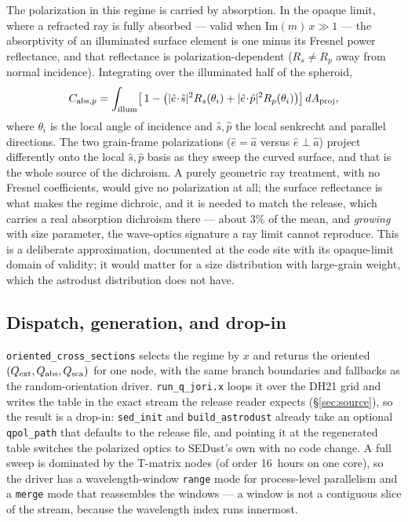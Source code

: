 \documentclass{my_memo}
\newcommand{\code}[1]{\texttt{#1}}
\begin{document}
The polarization in this regime is carried by absorption. In the opaque limit,
where a refracted ray is fully absorbed --- valid when
$\mathrm{Im}(m)\,x\gg1$ --- the absorptivity of an illuminated surface element is
one minus its Fresnel power reflectance, and that reflectance is
polarization-dependent ($R_s\neq R_p$ away from normal incidence). Integrating
over the illuminated half of the spheroid,
\[
  C_{{\rm abs},p}=\int_{\rm illum}
    \bigl[\,1-\bigl(|\hat e\!\cdot\!\hat s|^2 R_s(\theta_i)
                   +|\hat e\!\cdot\!\hat p|^2 R_p(\theta_i)\bigr)\bigr]
    \,dA_{\rm proj},
\]
where $\theta_i$ is the local angle of incidence and $\hat s,\hat p$ the local
senkrecht and parallel directions. The two grain-frame polarizations
($\hat e=\hat a$ versus $\hat e\perp\hat a$) project differently onto the local
$\hat s,\hat p$ basis as they sweep the curved surface, and that is the whole
source of the dichroism. A purely geometric ray treatment, with no Fresnel
coefficients, would give no polarization at all; the surface reflectance is what
makes the regime dichroic, and it is needed to match the release, which carries
a real absorption dichroism there --- about $3\%$ of the mean, and
\emph{growing} with size parameter, the wave-optics signature a ray limit cannot
reproduce. This is a deliberate approximation, documented at the code site with
its opaque-limit domain of validity; it would matter for a size distribution
with large-grain weight, which the astrodust distribution does not have.

\subsection{Dispatch, generation, and drop-in}

\code{oriented\_cross\_sections} selects the regime by $x$ and returns the
oriented $(Q_{\rm ext},Q_{\rm abs},Q_{\rm sca})$ for one node, with the same
branch boundaries and fallbacks as the random-orientation driver. \code{run\_q\_jori.x}
loops it over the DH21 grid and writes the table in the exact stream the release
reader expects (\S\ref{sec:source}), so the result is a drop-in:
\code{sed\_init} and \code{build\_astrodust} already take an optional
\code{qpol\_path} that defaults to the release file, and pointing it at the
regenerated table switches the polarized optics to SEDust's own with no code
change. A full sweep is dominated by the T-matrix nodes (of order 16~hours on
one core), so the driver has a wavelength-window \code{range} mode for
process-level parallelism and a \code{merge} mode that reassembles the windows
--- a window is not a contiguous slice of the stream, because the wavelength
index runs innermost.
\end{document}
